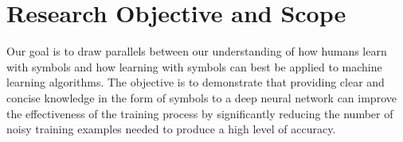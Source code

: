 \section{Research Objective and Scope} \label{sec:introduction-research-objective-scope}

Our goal is to draw parallels between our understanding of how humans learn with symbols and how learning with symbols can best be applied to machine learning algorithms. The objective is to demonstrate that providing clear and concise knowledge in the form of symbols to a deep neural network can improve the effectiveness of the training process by significantly reducing the number of noisy training examples needed to produce a high level of accuracy.




